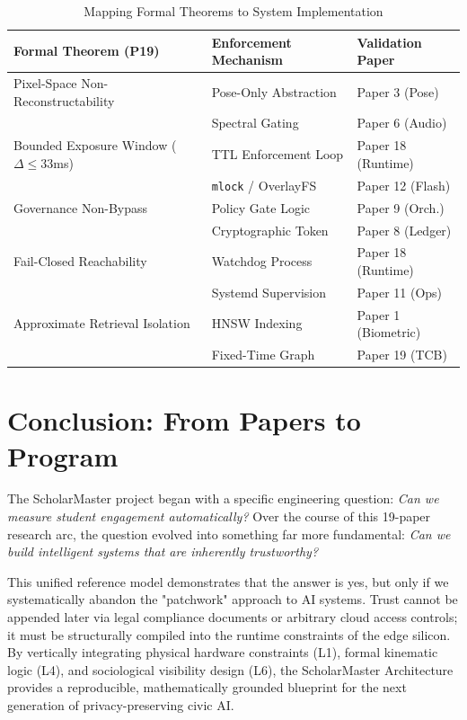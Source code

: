 \documentclass[conference]{IEEEtran}
\theoremstyle{definition}
\begin{document}
\begin{table}[htbp]
\caption{Mapping Formal Theorems to System Implementation}
\begin{center}
\begin{tabular}{p{2.5cm} p{2.5cm} p{2.5cm}}
\toprule
\textbf{Formal Theorem (P19)} & \textbf{Enforcement Mechanism} & \textbf{Validation Paper} \\
\midrule
Pixel-Space Non-Reconstructability & Pose-Only Abstraction & Paper 3 (Pose) \\
& Spectral Gating & Paper 6 (Audio) \\
\midrule
Bounded Exposure Window ($\Delta \le 33$ms) & TTL Enforcement Loop & Paper 18 (Runtime) \\
& \texttt{mlock} / OverlayFS & Paper 12 (Flash) \\
\midrule
Governance Non-Bypass & Policy Gate Logic & Paper 9 (Orch.) \\
& Cryptographic Token & Paper 8 (Ledger) \\
\midrule
Fail-Closed Reachability & Watchdog Process & Paper 18 (Runtime) \\
& Systemd Supervision & Paper 11 (Ops) \\
\midrule
Approximate Retrieval Isolation & HNSW Indexing & Paper 1 (Biometric) \\
& Fixed-Time Graph & Paper 19 (TCB) \\
\bottomrule
\end{tabular}
\end{center}
\end{table}

\section{Conclusion: From Papers to Program}
The ScholarMaster project began with a specific engineering question: \textit{Can we measure student engagement automatically?} Over the course of this 19-paper research arc, the question evolved into something far more fundamental: \textit{Can we build intelligent systems that are inherently trustworthy?}

This unified reference model demonstrates that the answer is yes, but only if we systematically abandon the "patchwork" approach to AI systems. Trust cannot be appended later via legal compliance documents or arbitrary cloud access controls; it must be structurally compiled into the runtime constraints of the edge silicon. By vertically integrating physical hardware constraints (L1), formal kinematic logic (L4), and sociological visibility design (L6), the ScholarMaster Architecture provides a reproducible, mathematically grounded blueprint for the next generation of privacy-preserving civic AI.
\end{document}
